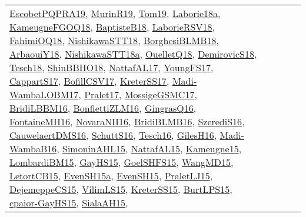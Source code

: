 {\begin{longtable}{lp{3cm}>{\raggedright}p{6cm}>{\raggedright}p{6cm}p{8cm}}
\href{articles/EscobetPQPRA19.pdf}{EscobetPQPRA19}\cite{EscobetPQPRA19}, \href{papers/MurinR19.pdf}{MurinR19}\cite{MurinR19}, \href{papers/Tom19.pdf}{Tom19}\cite{Tom19}, \href{papers/Laborie18a.pdf}{Laborie18a}\cite{Laborie18a}, \href{papers/KameugneFGOQ18.pdf}{KameugneFGOQ18}\cite{KameugneFGOQ18}, \href{articles/BaptisteB18.pdf}{BaptisteB18}\cite{BaptisteB18}, \href{articles/LaborieRSV18.pdf}{LaborieRSV18}\cite{LaborieRSV18}, \href{articles/FahimiOQ18.pdf}{FahimiOQ18}\cite{FahimiOQ18}, \href{papers/NishikawaSTT18.pdf}{NishikawaSTT18}\cite{NishikawaSTT18}, \href{articles/BorghesiBLMB18.pdf}{BorghesiBLMB18}\cite{BorghesiBLMB18}, \href{papers/ArbaouiY18.pdf}{ArbaouiY18}\cite{ArbaouiY18}, \href{papers/NishikawaSTT18a.pdf}{NishikawaSTT18a}\cite{NishikawaSTT18a}, \href{papers/OuelletQ18.pdf}{OuelletQ18}\cite{OuelletQ18}, \href{papers/DemirovicS18.pdf}{DemirovicS18}\cite{DemirovicS18}, \href{papers/Tesch18.pdf}{Tesch18}\cite{Tesch18}, \href{articles/ShinBBHO18.pdf}{ShinBBHO18}\cite{ShinBBHO18}, \href{articles/NattafAL17.pdf}{NattafAL17}\cite{NattafAL17}, \href{papers/YoungFS17.pdf}{YoungFS17}\cite{YoungFS17}, \href{papers/CappartS17.pdf}{CappartS17}\cite{CappartS17}, \href{papers/BofillCSV17.pdf}{BofillCSV17}\cite{BofillCSV17}, \href{articles/KreterSS17.pdf}{KreterSS17}\cite{KreterSS17}, \href{papers/Madi-WambaLOBM17.pdf}{Madi-WambaLOBM17}\cite{Madi-WambaLOBM17}, \href{papers/Pralet17.pdf}{Pralet17}\cite{Pralet17}, \href{papers/MossigeGSMC17.pdf}{MossigeGSMC17}\cite{MossigeGSMC17}, \href{papers/BridiLBBM16.pdf}{BridiLBBM16}\cite{BridiLBBM16}, \href{papers/BonfiettiZLM16.pdf}{BonfiettiZLM16}\cite{BonfiettiZLM16}, \href{papers/GingrasQ16.pdf}{GingrasQ16}\cite{GingrasQ16}, \href{papers/FontaineMH16.pdf}{FontaineMH16}\cite{FontaineMH16}, \href{articles/NovaraNH16.pdf}{NovaraNH16}\cite{NovaraNH16}, \href{articles/BridiBLMB16.pdf}{BridiBLMB16}\cite{BridiBLMB16}, \href{papers/SzerediS16.pdf}{SzerediS16}\cite{SzerediS16}, \href{papers/CauwelaertDMS16.pdf}{CauwelaertDMS16}\cite{CauwelaertDMS16}, \href{papers/SchuttS16.pdf}{SchuttS16}\cite{SchuttS16}, \href{papers/Tesch16.pdf}{Tesch16}\cite{Tesch16}, \href{papers/GilesH16.pdf}{GilesH16}\cite{GilesH16}, \href{papers/Madi-WambaB16.pdf}{Madi-WambaB16}\cite{Madi-WambaB16}, \href{articles/SimoninAHL15.pdf}{SimoninAHL15}\cite{SimoninAHL15}, \href{articles/NattafAL15.pdf}{NattafAL15}\cite{NattafAL15}, \href{articles/Kameugne15.pdf}{Kameugne15}\cite{Kameugne15}, \href{papers/LombardiBM15.pdf}{LombardiBM15}\cite{LombardiBM15}, \href{papers/GayHS15.pdf}{GayHS15}\cite{GayHS15}, \href{articles/GoelSHFS15.pdf}{GoelSHFS15}\cite{GoelSHFS15}, \href{articles/WangMD15.pdf}{WangMD15}\cite{WangMD15}, \href{articles/LetortCB15.pdf}{LetortCB15}\cite{LetortCB15}, \href{articles/EvenSH15a.pdf}{EvenSH15a}\cite{EvenSH15a}, \href{papers/EvenSH15.pdf}{EvenSH15}\cite{EvenSH15}, \href{papers/PraletLJ15.pdf}{PraletLJ15}\cite{PraletLJ15}, \href{papers/DejemeppeCS15.pdf}{DejemeppeCS15}\cite{DejemeppeCS15}, \href{papers/VilimLS15.pdf}{VilimLS15}\cite{VilimLS15}, \href{papers/KreterSS15.pdf}{KreterSS15}\cite{KreterSS15}, \href{papers/BurtLPS15.pdf}{BurtLPS15}\cite{BurtLPS15}, \href{papers/cpaior-GayHS15.pdf}{cpaior-GayHS15}\cite{cpaior-GayHS15}, \href{papers/SialaAH15.pdf}{SialaAH15}\cite{SialaAH15}, 
\end{longtable}}
